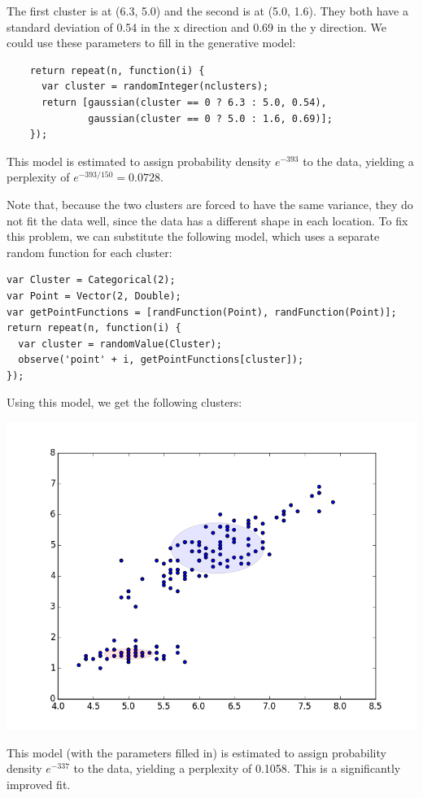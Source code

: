\documentclass{article}
\begin{document}
  The first cluster is at (6.3, 5.0) and the second is at (5.0, 1.6).  They both
  have a standard deviation of 0.54 in the x direction and 0.69 in the y direction.
  We could use these parameters to fill in the generative model:
  \begin{verbatim}
    return repeat(n, function(i) {
      var cluster = randomInteger(nclusters);
      return [gaussian(cluster == 0 ? 6.3 : 5.0, 0.54),
              gaussian(cluster == 0 ? 5.0 : 1.6, 0.69)];
    });
  \end{verbatim}
  This model is estimated to assign probability density $e^{-393}$ to the data, yielding a perplexity of $e^{-393/150} = 0.0728$.

  Note that, because the two clusters are forced to have the same variance, they do not fit the data well,
  since the data has a different shape in each location.  To fix this problem, we can substitute the following
  model, which uses a separate random function for each cluster:
  \begin{verbatim}
var Cluster = Categorical(2);
var Point = Vector(2, Double);
var getPointFunctions = [randFunction(Point), randFunction(Point)];
return repeat(n, function(i) {
  var cluster = randomValue(Cluster);
  observe('point' + i, getPointFunctions[cluster]);
});
\end{verbatim}
  Using this model, we get the following clusters:
  \begin{center}
    \includegraphics[scale=0.5]{../plots/irisclusters_indep.png}
  \end{center}
  This model (with the parameters filled in) is estimated to assign probability density $e^{-337}$ to the data, yielding a perplexity of 0.1058.  This is a significantly improved fit.
\end{document}
